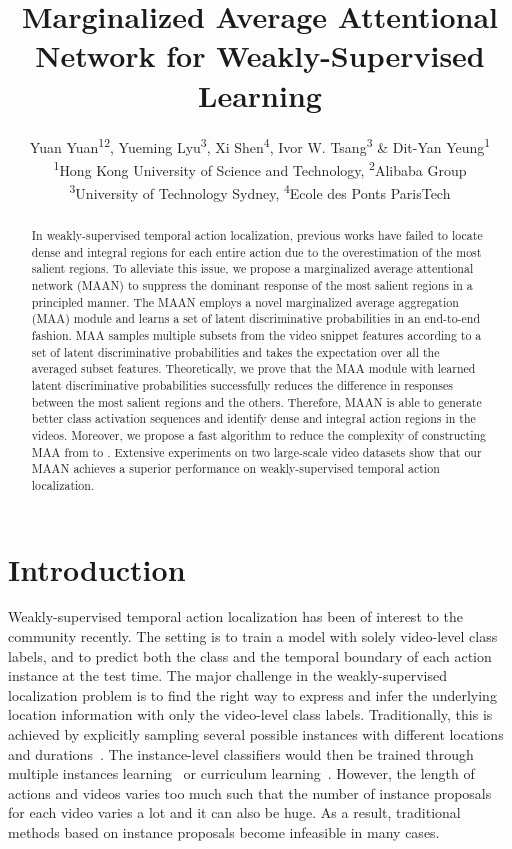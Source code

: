 \documentclass{article} \usepackage{iclr2019_conference,times}
\title{Marginalized Average Attentional Network for Weakly-Supervised Learning}
\author{Yuan Yuan\textsuperscript{12}, Yueming Lyu\textsuperscript{3}, Xi Shen\textsuperscript{4}, Ivor W. Tsang\textsuperscript{3} \& Dit-Yan Yeung\textsuperscript{1} \\\textsuperscript{1}Hong Kong University of Science and Technology, \textsuperscript{2}Alibaba Group \\\textsuperscript{3}University of Technology Sydney, \textsuperscript{4}Ecole des Ponts ParisTech }
\begin{document}
\maketitle

\begin{abstract}
In weakly-supervised temporal action localization, previous works have failed to locate dense and integral regions for each entire action due to the overestimation of the most salient regions. To alleviate this issue, we propose a marginalized average attentional network (MAAN) to suppress the dominant response of the most salient regions in a principled manner. The MAAN employs a novel marginalized average aggregation (MAA) module and learns a set of latent discriminative probabilities in an end-to-end fashion. 
MAA samples multiple subsets from the video snippet features according to a set of latent discriminative probabilities and takes the expectation over all the averaged subset features.
Theoretically, we prove that the MAA module with learned latent discriminative probabilities successfully reduces the difference in responses between the most salient regions and the others.
Therefore, MAAN is able to generate better class activation sequences and identify dense and integral action regions in the videos. 
Moreover, we propose a fast algorithm to reduce the complexity of constructing MAA from  to . Extensive experiments on two large-scale video datasets show that our MAAN achieves a superior performance on weakly-supervised temporal action localization.


\end{abstract}



\section{Introduction}
Weakly-supervised temporal action localization has been of interest to the community recently. The setting is to train a model with solely video-level class labels, and to predict both the class and the temporal boundary of each action instance at the test time.
The major challenge in the weakly-supervised localization problem is to find the right way to express and infer the underlying location information with only the video-level class labels.
Traditionally, this is achieved by explicitly sampling several possible instances with different locations and durations~\citep{bilen2016weakly,kantorov2016contextlocnet,zhang2017co}. The instance-level classifiers would then be trained through multiple instances learning~\citep{cinbis2017weakly, yuan2017temporal} or curriculum learning~\citep{bengio2009curriculum}. 
However, the length of actions and videos varies too much such that the number of instance proposals for each video varies a lot and it can also be huge. As a result, traditional methods based on instance proposals become infeasible in many cases.
\end{document}
